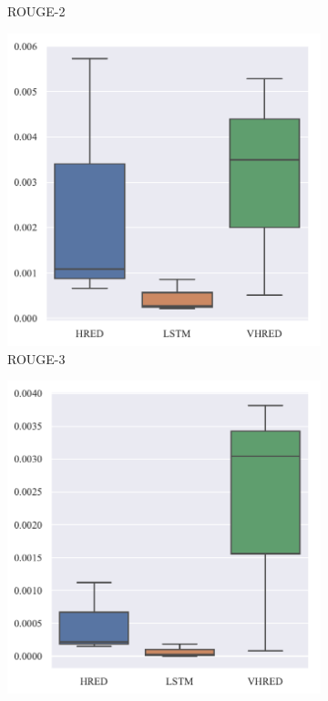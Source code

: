 \begin{figure}[H]
\begin{subfigure}{0.3\linewidth}
        \caption{ROUGE-2}
    \end{subfigure}%
    \begin{subfigure}{0.3\linewidth}
        \centering
        \includegraphics[width=\linewidth]{figure/boxplot/model/rouge_3/plot.pdf}
        \caption{ROUGE-3}
    \end{subfigure}
    \begin{subfigure}{0.3\linewidth}
        \centering
        \includegraphics[width=\linewidth]{figure/boxplot/model/rouge_4/plot.pdf}

\end{subfigure}
\end{figure}
